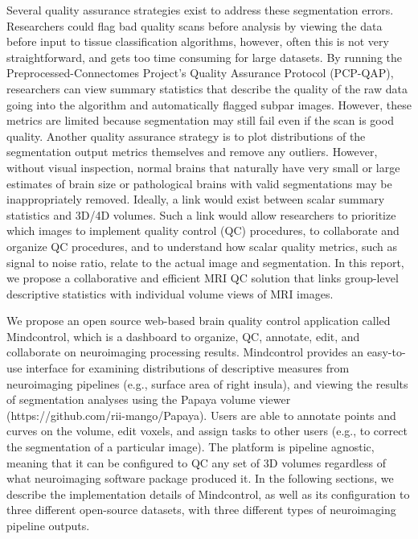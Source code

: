 Several quality assurance strategies exist to address these segmentation errors. Researchers could flag bad quality scans before analysis by viewing the data before input to tissue classification algorithms, however, often this is not very straightforward, and gets too time consuming for large datasets. By running the Preprocessed-Connectomes Project’s Quality Assurance Protocol (PCP-QAP)\cite{shehzadpreprocessed}, researchers can view summary statistics that describe the quality of the raw data going into the algorithm and automatically flagged subpar images. However, these metrics are limited because segmentation may still fail even if the scan is good quality. Another quality assurance strategy is to plot distributions of the segmentation output metrics themselves and remove any outliers. However, without visual inspection, normal brains that naturally have very small or large estimates of brain size or pathological brains with valid segmentations may be inappropriately removed. Ideally, a link would exist between scalar summary statistics and 3D/4D volumes. Such a link would allow researchers to prioritize which images to implement quality control (QC) procedures, to collaborate and organize QC procedures, and to understand how scalar quality metrics, such as signal to noise ratio, relate to the actual image and segmentation. In this report, we propose a collaborative and efficient MRI QC solution that links group-level descriptive statistics with individual volume views of MRI images.  

We propose an open source web-based brain quality control application called Mindcontrol, which is a dashboard to organize, QC, annotate, edit, and collaborate on neuroimaging processing results. Mindcontrol provides an easy-to-use interface for examining distributions of descriptive measures from neuroimaging pipelines (e.g., surface area of right insula), and viewing the results of segmentation analyses using the Papaya volume viewer (https://github.com/rii-mango/Papaya). Users are able to annotate points and curves on the volume, edit voxels, and assign tasks to other users (e.g., to correct the segmentation of a particular image). The platform is pipeline agnostic, meaning that it can be configured to QC any set of 3D volumes regardless of what neuroimaging software package produced it. In the following sections, we describe the implementation details of Mindcontrol, as well as its configuration to three different open-source datasets, with three different types of neuroimaging pipeline outputs. 

